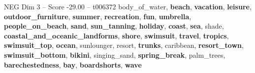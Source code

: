 \begin{textsample}{NEG Dim 3 – Score -29.00 – t006372}  \label{ex:f3_neg_006}
body\_of\_water, \textbf{beach}, \textbf{vacation}, \textbf{leisure}, \textbf{outdoor\_furniture}, \textbf{summer}, \textbf{recreation}, \textbf{fun}, \textbf{umbrella}, \textbf{people\_on\_beach}, \textbf{sand}, \textbf{sun\_tanning}, \textbf{holiday}, \textbf{coast}, \textbf{sea}, shade, \textbf{coastal\_and\_oceanic\_landforms}, \textbf{shore}, \textbf{swimsuit}, \textbf{travel}, \textbf{tropics}, \textbf{swimsuit\_top}, \textbf{ocean}, sunlounger, resort, \textbf{trunks}, caribbean, \textbf{resort\_town}, \textbf{swimsuit\_bottom}, \textbf{bikini}, singing\_sand, \textbf{spring\_break}, palm\_trees, \textbf{barechestedness}, \textbf{bay}, \textbf{boardshorts}, \textbf{wave}

\end{textsample}
